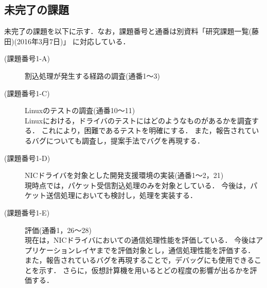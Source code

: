 \documentclass[12pt]{jsarticle}
\begin{document}
\subsection{未完了の課題}
未完了の課題を以下に示す．なお，課題番号と通番は別資料「研究課題一覧(藤田)(2016年3月7日)」
に対応している．
\begin{description}
    \item[(課題番号1-A)]割込処理が発生する経路の調査(通番1〜3)
    \item[(課題番号1-C)]Linuxのテストの調査(通番10〜11)\\
        Linuxにおける，ドライバのテストにはどのようなものがあるかを調査する．
        これにより，困難であるテストを明確にする．
        また，報告されているバグについても調査し，提案手法でバグを再現する．
    \item[(課題番号1-D)]NICドライバを対象とした開発支援環境の実装(通番1〜2，21)\\
        現時点では，パケット受信割込処理のみを対象としている．
        今後は，パケット送信処理においても検討し，処理を実装する．
    \item[(課題番号1-E)]評価(通番1，26〜28)\\
        現在は，NICドライバにおいての通信処理性能を評価している．
        今後はアプリケーションレイヤまでを評価対象とし，通信処理性能を評価する．
        また，報告されているバグを再現することで，デバッグにも使用できることを示す．
        さらに，仮想計算機を用いるとどの程度の影響が出るかを評価する．
\end{description}
\end{document}
